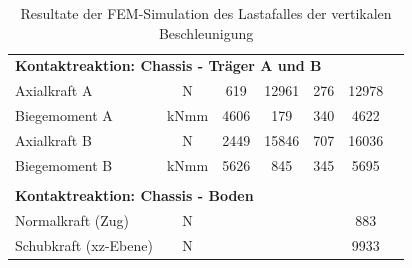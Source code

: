\begin{table}[H]
\begin{tabular}{lcccccc}
  \multicolumn{5}{l}{\textbf{Kontaktreaktion: Chassis - Träger A und B}}									&		&		\\	\thickhline
  Axialkraft A	&	N	&	619	&	12961	&	276	&	12978	&		\\
  Biegemoment A	&	kNmm	&	4606	&	179	&	340	&	4622	&		\\
  Axialkraft B	&	N	&	2449	&	15846	&	707	&	16036	&		\\
  Biegemoment B	&	kNmm	&	5626	&	845	&	345	&	5695	&		\\	\hline	\\
  \multicolumn{5}{l}{\textbf{Kontaktreaktion: Chassis - Boden}}									&		&		\\	\thickhline
  Normalkraft (Zug)	&	N	&		&		&		&	883	&		\\
  Schubkraft (xz-Ebene)	&	N	&		&		&		&	9933	&		\\	\hline
  \end{tabular}
  \caption{Resultate der FEM-Simulation des Lastafalles der vertikalen Beschleunigung}
  \label{tab:FEM 1.1}
  \end{table}


